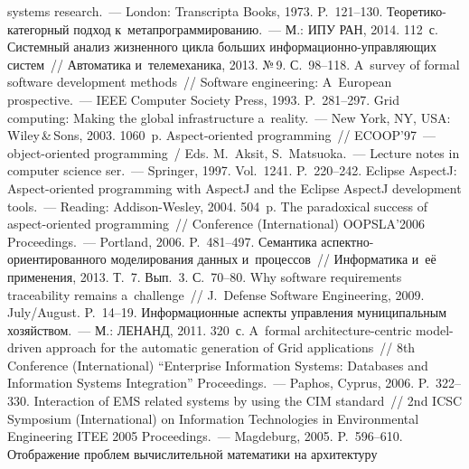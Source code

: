 \begin{multicols}{2}
{{\begin{thebibliography}{99}
systems research.~--- London: Transcripta Books, 1973. P.~121--130.
 Тео\-ре\-ти\-ко-ка\-те\-гор\-ный подход к~метапрограммированию.~--- М.: 
ИПУ РАН, 2014. 112~с.
 Системный анализ жизненного цикла больших  
ин\-фор\-ма\-ци\-он\-но-управ\-ля\-ющих сис\-тем~// Автоматика и~телемеханика, 2013. №\,9. 
С.~98--118.
 A~survey of formal software development methods~// Software engineering: 
A~European prospective.~--- IEEE Computer Society Press, 1993. P.~281--297.
Grid computing: Making the global infrastructure a~reality.~---  New York, NY, USA: 
Wiley\,\&\,Sons, 2003. 1060~p.
Aspect-oriented programming~// ECOOP'97~--- object-oriented programming~/
Eds. M.~Aksit, S.~Matsuoka.~--- Lecture notes in computer science ser.~---
Springer, 1997. Vol.~1241.  
P.~220--242.
 Eclipse AspectJ: Aspect-oriented 
programming with AspectJ and the Eclipse AspectJ development tools.~--- Reading:  
Addison-Wesley, 2004. 504~p.
 The paradoxical success of aspect-oriented programming~//  Conference 
(International) \mbox{OOPSLA'2006} Proceedings.~--- Portland, 2006. P.~481--497.
 Семантика аспектно-ори\-ен\-ти\-ро\-ван\-но\-го моделирования данных 
и~процессов~// Информатика и~её применения, 2013. Т.~7. Вып.~3. С.~70--80.
 Why software requirements traceability remains a~challenge~// 
J.~Defense Software Engineering, 2009. July/August. P.~14--19.
 Информационные аспекты управления 
муниципальным хозяйством.~--- М.: ЛЕНАНД, 2011. 320~с.
 A~formal architecture-centric 
model-driven approach for the automatic generation of Grid applications~// 8th Conference (International)  
``Enterprise Information Systems: Databases and Information Systems Integration''  
Proceedings.~--- Paphos, Cyprus, 2006. P.~322--330.
 Interaction of 
EMS related systems by using the CIM standard~// 2nd  ICSC Symposium (International) 
on Information Technologies in Environmental Engineering ITEE 2005 Proceedings.~--- Magdeburg, 
2005. P.~596--610.
 Отображение проблем вычислительной математики на архитектуру 

\end{thebibliography}}}
\end{multicols}

